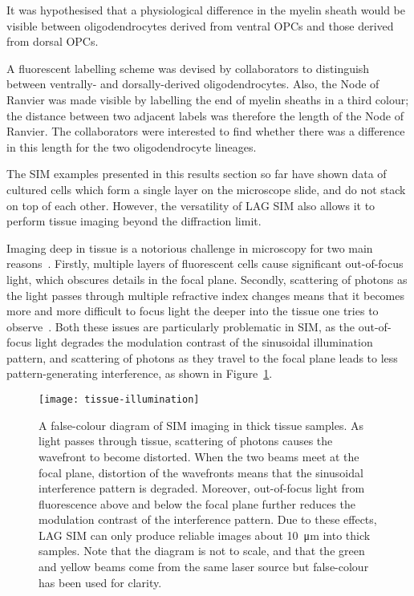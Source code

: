 It was hypothesised that a physiological difference in the myelin sheath would be visible between oligodendrocytes derived from ventral OPCs and those derived from dorsal OPCs.

A fluorescent labelling scheme was devised by collaborators to distinguish between ventrally- and dorsally-derived oligodendrocytes.
Also, the Node of Ranvier was made visible by labelling the end of myelin sheaths in a third colour; the distance between two adjacent labels was therefore the length of the Node of Ranvier.
The collaborators were interested to find whether there was a difference in this length for the two oligodendrocyte lineages.

The SIM examples presented in this results section so far have shown data of cultured cells which form a single layer on the microscope slide, and do not stack on top of each other.
However, the versatility of LAG SIM also allows it to perform tissue imaging beyond the diffraction limit.

Imaging deep in tissue is a notorious challenge in microscopy for two main reasons~\cite{wimmer2010high}.
Firstly, multiple layers of fluorescent cells cause significant out-of-focus light, which obscures details in the focal plane.
Secondly, scattering of photons as the light passes through multiple refractive index changes means that it becomes more and more difficult to focus light the deeper into the tissue one tries to observe~\cite{jacques2013optical}.
Both these issues are particularly problematic in SIM, as the out-of-focus light degrades the modulation contrast of the sinusoidal illumination pattern, and scattering of photons as they travel to the focal plane leads to less pattern-generating interference, as shown in Figure~\ref{fig:tissue-illumination}.

\begin{figure}[htbp!]
\centering
\texttt{[image: tissue-illumination]}
\caption[LAG SIM: Imaging in tissue degrades the SIM pattern due to photon scattering and out-of-focus light]{A false-colour diagram of SIM imaging in thick tissue samples.
As light passes through tissue, scattering of photons causes the wavefront to become distorted. When the two beams meet at the focal plane, distortion of the wavefronts means that the sinusoidal interference pattern is degraded. Moreover, out-of-focus light from fluorescence above and below the focal plane further reduces the modulation contrast of the interference pattern. Due to these effects, LAG SIM can only produce reliable images about \SI{10}{\micro\metre} into thick samples. Note that the diagram is not to scale, and that the green and yellow beams come from the same laser source but false-colour has been used for clarity. }
\label{fig:tissue-illumination}
\end{figure}

